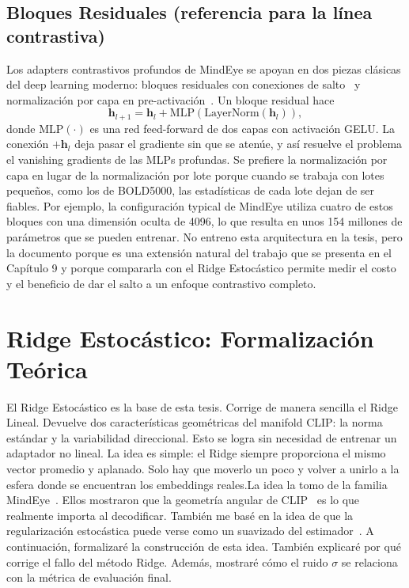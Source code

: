 \subsection{Bloques Residuales (referencia para la línea contrastiva)}

Los adapters contrastivos profundos de MindEye se apoyan en dos piezas clásicas del deep 
learning moderno: bloques residuales con conexiones de salto~\cite{he2016deep} y normalización 
por capa en pre-activación~\cite{ba2016layernorm}. Un bloque residual hace
\begin{equation}
\mathbf{h}_{l+1} = \mathbf{h}_l + \text{MLP}\!\left(\text{LayerNorm}(\mathbf{h}_l)\right),
\end{equation}
donde $\text{MLP}(\cdot)$ es una red feed-forward de dos capas con activación GELU. La 
conexión $+\mathbf{h}_l$ deja pasar el gradiente sin que se atenúe, y así resuelve el problema 
el vanishing gradients de las MLPs profundas. Se prefiere la normalización por ~\cite{ioffe2015batchnorm} 
capa en lugar de la normalización por lote porque cuando se trabaja con 
lotes pequeños, como los de BOLD5000, las estadísticas de cada lote dejan de ser fiables.
Por ejemplo, la configuración typical de MindEye utiliza cuatro de estos bloques con una dimensión 
oculta de 4096, lo que resulta en unos 154 millones de parámetros que se pueden entrenar.
No entreno esta arquitectura en la tesis, pero la documento porque es una extensión natural del trabajo 
que se presenta en el Capítulo 9 y porque compararla con el Ridge Estocástico permite medir el costo y el 
beneficio de dar el salto a un enfoque contrastivo completo.

\section{Ridge Estocástico: Formalización Teórica}\label{sec:ridge_stoch}

El Ridge Estocástico es la base de esta tesis. Corrige de manera sencilla el Ridge Lineal.
Devuelve dos características geométricas del manifold CLIP: la norma estándar y la
variabilidad direccional. Esto se logra sin necesidad de entrenar un adaptador no lineal.
La idea es simple: el Ridge siempre proporciona el mismo vector promedio y aplanado.
Solo hay que moverlo un poco y volver a unirlo a la esfera donde se encuentran los
embeddings reales.La idea la tomo de la familia MindEye~\cite{scotti2023mindeye,scotti2024mindeye2}. 
Ellos mostraron que la geometría angular de CLIP~\cite{liang2022mind} es lo que realmente importa al 
decodificar. También me basé en la idea de que la regularización estocástica puede verse como un 
suavizado del estimador~\cite{hastie2009elements}. A continuación, formalizaré la construcción de esta
idea. También explicaré por qué corrige el fallo del método Ridge. Además, mostraré cómo el ruido $\sigma$ 
se relaciona con la métrica de evaluación final.


